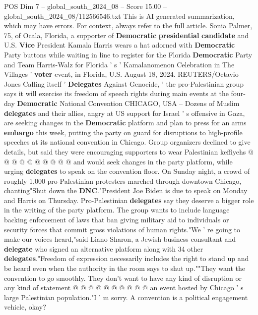 \begin{textsample}{POS Dim 7 – global\_south\_2024\_08 – Score 15.00 – global\_south\_2024\_08/112566546.txt}  \label{ex:f7_pos_178}
This is AI generated summarization, which may have errors.
For context, always refer to the full article.
Sonia Palmer, 75, of Ocala, Florida, a supporter of \textbf{Democratic} \textbf{presidential} \textbf{candidate} and U.S. \textbf{Vice} President Kamala Harris wears a hat adorned with \textbf{Democratic} Party buttons while waiting in line to register for the Florida \textbf{Democratic} Party and Team Harris-Walz for Florida ' s ' Kamalanomenon Celebration in The Villages ' \textbf{voter} event, in Florida, U.S.
August 18, 2024.
REUTERS/Octavio Jones Calling itself ' \textbf{Delegates} Against Genocide, ' the pro-Palestinian group says it will exercise its freedom of speech rights during main events at the four-day \textbf{Democratic} National Convention CHICAGO, USA -- Dozens of Muslim \textbf{delegates} and their allies, angry at US support for Israel ' s offensive in Gaza, are seeking changes in the \textbf{Democratic} platform and plan to press for an arms \textbf{embargo} this week, putting the party on guard for disruptions to high-profile speeches at its national convention in Chicago.
Group organizers declined to give details, but said they were encouraging supporters to wear Palestinian keffiyehs @ @ @ @ @ @ @ @ @ @ and would seek changes in the party platform, while urging \textbf{delegates} to speak on the convention floor.
On Sunday night, a crowd of roughly 1,000 pro-Palestinian protesters marched through downtown Chicago, chanting"Shut down the \textbf{DNC}."President Joe Biden is due to speak on Monday and Harris on Thursday.
Pro-Palestinian \textbf{delegates} say they deserve a bigger role in the writing of the party platform.
The group wants to include language backing enforcement of laws that ban giving military aid to individuals or security forces that commit gross violations of human rights."We ' re going to make our voices heard,"said Liano Sharon, a Jewish business consultant and \textbf{delegate} who signed an alternative platform along with 34 other \textbf{delegates}."Freedom of expression necessarily includes the right to stand up and be heard even when the authority in the room says to shut up.""They want the convention to go smoothly.
They don't want to have any kind of disruption or any kind of statement @ @ @ @ @ @ @ @ @ @ an event hosted by Chicago ' s large Palestinian population."I ' m sorry.
A convention is a political engagement vehicle, okay?

\end{textsample}
